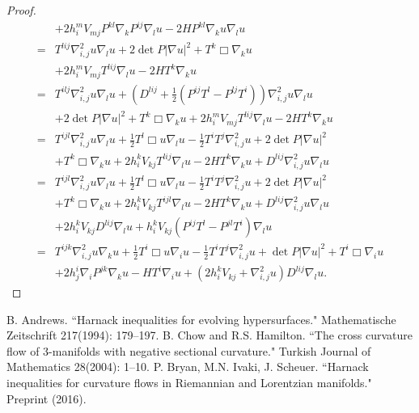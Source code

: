 \documentclass{amsart}
\theoremstyle{definition}
\theoremstyle{remark}
\numberwithin{equation}{section}
\begin{document}
\begin{proof}
\begin{align*}
&+2h_i^mV_{mj}P^{kl}\nabla_kP^{ij}\nabla_lu-2HP^{kl}\nabla_ku\nabla_lu\\
=&T^{lij}\nabla^2_{i,j}u\nabla_lu+2\det P|\nabla u|^2+T^{k}\Box\nabla_ku\\
&+2h_i^mV_{mj}T^{lij}\nabla_lu-2HT^{k}\nabla_ku\\
=& {T^{ilj}\nabla^2_{i,j}u\nabla_lu}+\left(D^{lij}+\frac{1}{2}\left(P^{ij}T^l-P^{lj}T^i\right)\right)\nabla^2_{i,j}u\nabla_lu\\
&+2\det P|\nabla u|^2+ {T^{k}\Box\nabla_ku}+2h_i^mV_{mj}T^{lij}\nabla_lu-2HT^{k}\nabla_ku\\
=& {T^{ijl}\nabla^2_{i,j}u\nabla_lu}+\frac{1}{2}T^l\Box u\nabla_lu-\frac{1}{2}T^iT^j\nabla^2_{i,j}u+2\det P|\nabla u|^2\\
&+{T^{k}\Box\nabla_ku}+2h_i^kV_{kj}T^{lij}\nabla_lu-2HT^{k}\nabla_ku+D^{lij}\nabla^2_{i,j}u\nabla_lu\\
=&{T^{ijl}\nabla^2_{i,j}u\nabla_lu}+\frac{1}{2}T^l\Box u\nabla_lu-\frac{1}{2}T^iT^j\nabla^2_{i,j}u+2\det P|\nabla u|^2\\
&+{T^{k}\Box\nabla_ku}+2h_i^kV_{kj}T^{ijl}\nabla_lu-2HT^{k}\nabla_ku+D^{lij}\nabla^2_{i,j}u\nabla_lu\\
&+2h_i^kV_{kj}D^{lij}\nabla_lu+h_i^kV_{kj}(P^{ij}T^l-P^{jl}T^i)\nabla_lu\\
=&{T^{ijk}\nabla^2_{i,j}u\nabla_ku}+\frac{1}{2}T^i\Box u\nabla_iu-\frac{1}{2}T^iT^j\nabla^2_{i,j}u+\det P|\nabla u|^2+{T^i\Box\nabla_iu}\\
&+2h_{j}^i\nabla_iP^{jk}\nabla_ku-HT^{i}\nabla_iu+\left(2h_i^kV_{kj}+\nabla^2_{i,j}u\right)D^{lij}\nabla_lu.
\end{align*}
\end{proof}


\begin{thebibliography}{10}
 B. Andrews. ``Harnack inequalities for evolving hypersurfaces." Mathematische Zeitschrift 217(1994): 179--197.
 B. Chow and R.S. Hamilton. ``The cross curvature flow of 3-manifolds with negative sectional curvature." Turkish Journal of Mathematics 28(2004): 1--10.
 P. Bryan, M.N. Ivaki, J. Scheuer. ``Harnack inequalities for curvature flows in Riemannian and Lorentzian manifolds." Preprint (2016).
\end{thebibliography}
\end{document}
